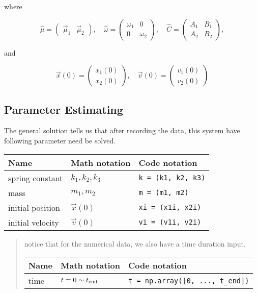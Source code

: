 \documentclass[
]{article}
\begin{document}
where

\[\hat{\mu} = \begin{pmatrix}\vec{\mu}_1&\vec{\mu}_2\end{pmatrix}, \quad 
	\hat{\omega} = \begin{pmatrix}\omega_1&0\\0&\omega_2\end{pmatrix},\quad
	\hat{C} = \begin{pmatrix}A_{1}&B_{1}\\A_{2}&B_{2}\end{pmatrix},\]

and

\[\vec{x}\left(0\right) = \begin{pmatrix}x_1\left(0\right)\\x_2\left(0\right)\end{pmatrix}
,\quad
\vec{v}\left(0\right) = \begin{pmatrix}v_1\left(0\right)\\v_2\left(0\right)\end{pmatrix}\]

\newpage

\hypertarget{parameter-estimating}{%
\subsection{Parameter Estimating}\label{parameter-estimating}}

The general solution tells us that after recording the data, this system
have following parameter need be solved.

\begin{longtable}[]{@{}lll@{}}
\toprule\noalign{}
Name & Math notation & Code notation \\
\midrule\noalign{}
\endhead
\bottomrule\noalign{}
\endlastfoot
spring constant & \(k_1, k_2, k_3\) & \texttt{k\ =\ (k1,\ k2,\ k3)} \\
mass & \(m_1, m_2\) & \texttt{m\ =\ (m1,\ m2)} \\
initial position & \(\vec{x}\left(0\right)\) &
\texttt{xi\ =\ (x1i,\ x2i)} \\
initial velocity & \(\vec{v}\left(0\right)\) &
\texttt{vi\ =\ (v1i,\ v2i)} \\
\end{longtable}

\begin{quote}
notice that for the numerical data, we also have a time duration input.

\begin{longtable}[]{@{}lll@{}}
\toprule\noalign{}
Name & Math notation & Code notation \\
\midrule\noalign{}
\endhead
\bottomrule\noalign{}
\endlastfoot
time & \(t = 0\sim t_{\rm end}\) &
\texttt{t\ =\ np.array({[}0,\ ...,\ t\_end{]})} \\
\end{longtable}
\end{quote}
\end{document}
